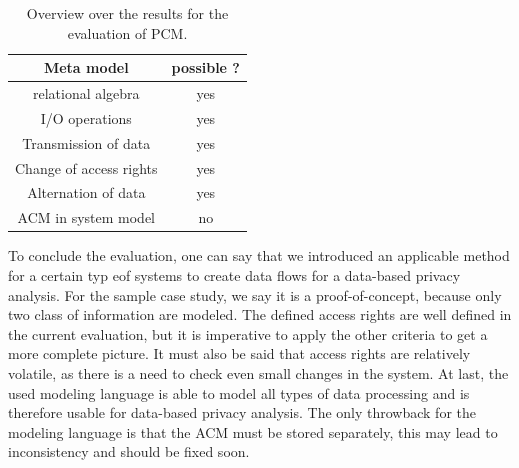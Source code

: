 \begin{table}
\begin{tabular}{|c|c|}
\hline 
Meta model  & possible ? \\ 
\hline 
relational algebra & yes \\ 
\hline 
I/O operations & yes \\ 
\hline 
Transmission of data & yes \\ 
\hline 
Change of access rights & yes \\ 
\hline 
Alternation of data & yes \\ 
\hline 
ACM in system model & no \\
\hline
\end{tabular} 
\caption{Overview over the results for the evaluation of PCM.}
\label{eval_MM}
\end{table}
To conclude the evaluation, one can say that we introduced an applicable method for a certain typ eof systems to create data flows for a data-based privacy analysis. For the sample case study, we say it is a proof-of-concept, because only two class of information are modeled. The defined access rights are well defined in the current evaluation, but it is imperative to apply the other criteria to get a more complete picture. It must also be said that access rights are relatively volatile, as there is a need to check even small changes in the system. At last, the used modeling language is able to model all types of data processing and is therefore usable for data-based privacy analysis. The only throwback for the modeling language is that the ACM must be stored separately, this may lead to inconsistency and should be fixed soon.
